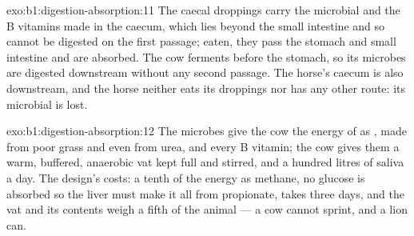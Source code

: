 \begin{solution}{exo:b1:digestion-absorption:11}
The caecal droppings carry the microbial  and the B vitamins
made in the caecum, which lies beyond the small intestine and so
cannot be digested on the first passage; eaten, they pass the stomach
and small intestine and are absorbed. The cow ferments before the
stomach, so its microbes are digested downstream without any second
passage. The horse's caecum is also downstream, and the horse neither
eats its droppings nor has any other route: its microbial  is
lost.
\end{solution}

\begin{solution}{exo:b1:digestion-absorption:12}
The microbes give the cow the energy of  as ,
 made from poor grass and even from urea, and every B vitamin;
the cow gives them a warm, buffered, anaerobic vat kept full and
stirred, and a hundred litres of saliva a day. The design's costs: a
tenth of the energy  as methane, no glucose is absorbed so the
liver must make it all from propionate,  takes three days,
and the vat and its contents weigh a fifth of the animal --- a cow
cannot sprint, and a lion can.
\end{solution}

